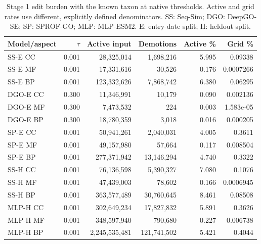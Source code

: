 \begin{table}[t]
\centering\small
\caption{Stage 1 edit burden with the known taxon at native thresholds. Active and grid rates use different, explicitly defined denominators. SS: Seq-Sim; DGO: DeepGO-SE; SP: SPROF-GO; MLP: MLP-ESM2. E: entry-date split; H: heldout split.}
\label{tab:main-flips}
\setlength{\tabcolsep}{4pt}
\begin{tabular}{lrrrrr}
\toprule
Model/aspect & $\tau$ & Active input & Demotions & Active \% & Grid \% \\
\midrule
SS-E CC & 0.001 & 28,325,014 & 1,698,216 & 5.995 & 0.09338 \\
SS-E MF & 0.001 & 17,331,616 & 30,526 & 0.176 & 0.0007266 \\
SS-E BP & 0.001 & 123,332,626 & 7,868,742 & 6.380 & 0.06295 \\
DGO-E CC & 0.300 & 11,346,991 & 10,179 & 0.090 & 0.002136 \\
DGO-E MF & 0.300 & 7,473,532 & 224 & 0.003 & 1.583e-05 \\
DGO-E BP & 0.300 & 18,780,359 & 3,018 & 0.016 & 0.000205 \\
SP-E CC & 0.001 & 50,941,261 & 2,040,031 & 4.005 & 0.3611 \\
SP-E MF & 0.001 & 49,157,980 & 57,664 & 0.117 & 0.008504 \\
SP-E BP & 0.001 & 277,371,942 & 13,146,294 & 4.740 & 0.3322 \\
SS-H CC & 0.001 & 76,136,598 & 5,390,327 & 7.080 & 0.1076 \\
SS-H MF & 0.001 & 47,439,003 & 78,602 & 0.166 & 0.0006945 \\
SS-H BP & 0.001 & 363,577,489 & 30,760,645 & 8.461 & 0.08508 \\
MLP-H CC & 0.001 & 302,649,234 & 17,827,832 & 5.891 & 0.3626 \\
MLP-H MF & 0.001 & 348,597,940 & 790,680 & 0.227 & 0.006738 \\
MLP-H BP & 0.001 & 2,245,535,481 & 121,741,502 & 5.421 & 0.4044 \\
\bottomrule
\end{tabular}
\end{table}
